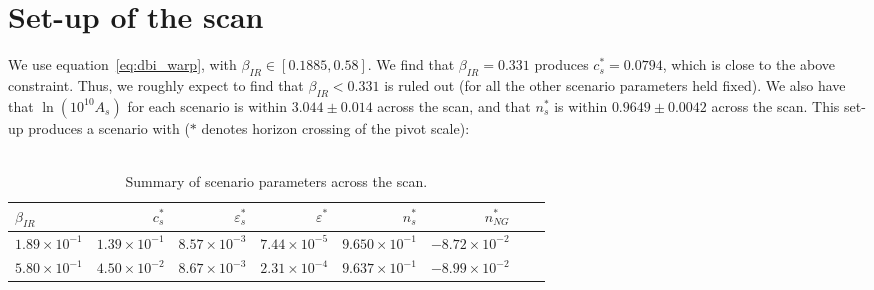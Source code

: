 \section{Set-up of the scan}
    We use equation~\eqref{eq:dbi_warp}, with $\beta_{IR}\in[0.1885, 0.58]$.
    We find that $\beta_{IR}=0.331$ produces $c_s^{*}=0.0794$,
    which is close to the above constraint.
    Thus, we roughly expect to find that $\beta_{IR}<0.331$ is ruled out
    (for all the other scenario parameters held fixed).
    We also have that $\ln\left(10^{10}A_s\right)$ for each scenario
    is within $3.044\pm0.014$ across the scan,
    and that $n_s^{*}$ is within $0.9649\pm0.0042$ across the scan.
    This set-up produces a scenario with ($*$ denotes horizon crossing of the pivot scale):
    \\
    \\
\begin{table}[h!]
  \begin{center}
    \begin{tabular}{lrrrrrrr}
        \toprule
        $\beta_{IR}$ &    $c_s^{*}$ &  $\varepsilon_s^{*}$ &   $\varepsilon^{*}$ &   $n_s^{*}$ &  $n_{NG}^{*}$\\
        \midrule
        $1.89\times 10^{-1}$  &  $1.39\times 10^{-1}$  &  $  8.57\times 10^{-3}$  &  $7.44\times 10^{-5}$  &  $9.650\times 10^{-1}$  &  $-8.72\times 10^{-2}$\\
        $5.80\times 10^{-1}$  &  $4.50\times 10^{-2}$  &  $  8.67\times 10^{-3}$  &  $2.31\times 10^{-4}$  &  $9.637\times 10^{-1}$  &  $-8.99\times 10^{-2}$\\
        \bottomrule
    \end{tabular}
    \caption{Summary of scenario parameters across the scan.}\label{tab:scan_summary}
  \end{center}
\end{table}
